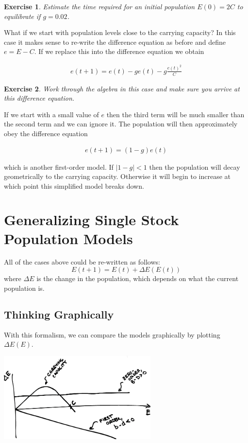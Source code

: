 \documentclass{tufte-handout}
\newtheorem{del}{Exercise}
\begin{document}
\begin{del}
Estimate the time required for an initial population $E(0) = 2C$ to equilibrate if $g = 0.02$.
\end{del}  

What if we start with population levels close to the carrying capacity? In this case it makes sense to re-write the difference equation as before and define $e = E-C$. If we replace this into the difference equation we obtain

\begin{eqnarray*}
e(t+1) = e(t) - ge(t) - g \frac{e(t)^2}{C}
\end{eqnarray*}

\begin{del}
Work through the algebra in this case and make sure you arrive at this difference equation.
\end{del}

If we start with a small value of $e$ then the third term will be much smaller than the second term and we can ignore it. The population will then approximately obey the difference equation

\begin{eqnarray*}
e(t+1) = (1-g) e(t)
\end{eqnarray*}

which is another first-order model. If $|1-g| < 1$ then the population will decay geometrically to the carrying capacity. Otherwise it will begin to increase at which point this simplified model breaks down.

\section*{Generalizing Single Stock Population Models}

All of the cases above could be re-written as follows:
$$ E(t+1) = E(t) + \Delta E(E(t))$$
where $\Delta E$ is the change in the population, which depends on what the current population is.


\subsection{Thinking Graphically}
With this formalism, we can compare the models graphically by plotting $\Delta E(E)$.  

\centerline{\includegraphics[width=8cm]{figs/DeltaEvsE.png}}
\end{document}
